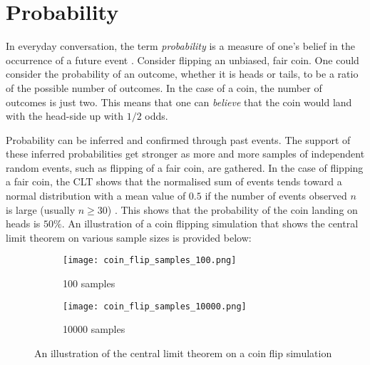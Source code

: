 \section{Probability}
\label{sec:probability:probability}

In everyday conversation, the term \textit{probability} is a measure of one's
belief in the occurrence of a future event \cite{ref:wackerly:2014}.
Consider flipping an unbiased, fair coin. One could consider the probability of
an outcome, whether it is heads or tails, to be a ratio of the possible number
of outcomes. In the case of a coin, the number of outcomes is just two. This
means that one can \textit{believe} that the coin would land with the head-side
up with $1/2$ odds.

Probability can be inferred and confirmed through past events. The support of
these inferred probabilities get stronger as more and more samples of
independent random events, such as flipping of a fair coin, are gathered.  In
the case of flipping a fair coin, the \ac{CLT} shows that the normalised sum of
events tends toward a normal distribution with a mean value of $0.5$ if the
number of events observed $n$ is large (usually $n \geq 30$)
\cite{ref:wackerly:2014}. This shows that the probability of the coin landing
on heads is $50\%$. An illustration of a coin flipping simulation that shows
the central limit theorem on various sample sizes is provided below:

\begin{figure}[ht]
    \centering
    \begin{subfigure}[b]{0.5\textwidth}
        \centering
        \texttt{[image: coin\_flip\_samples\_100.png]}
        \caption[Coin flip simulation. Samples=100]{100 samples}
        \label{fig:coin_flip_simulation_samples_100}
    \end{subfigure}
    \hfill
    \begin{subfigure}[b]{0.5\textwidth}
        \centering
        \texttt{[image: coin\_flip\_samples\_10000.png]}
        \caption[Coin flip simulation. Samples=100]{10000 samples}
        \label{fig:coin_flip_simulation_samples_10000}
    \end{subfigure}
    \caption{An illustration of the central limit theorem on a coin flip simulation}
    \label{fig:coin_flip_simulation}
\end{figure}








